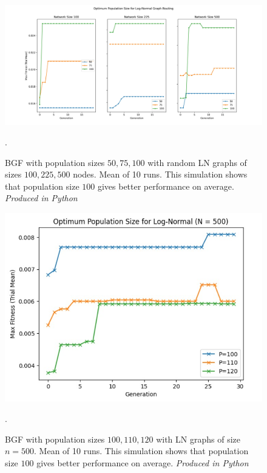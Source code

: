 \documentclass[
	a4paper, %
	10pt, %
	unnumberedsections, %
	twoside, %
]{LTJournalArticle}
\begin{document}
\begin{figure}
	\includegraphics[width=\linewidth]{Figures/sims/population/lognormal.jpg}
	\caption{BGF with population sizes \(50, 75, 100\) with random LN graphs of sizes \(100, 225, 500\) nodes. Mean of 10 runs. This simulation shows that population size \(100\) gives better performance on average. \emph{Produced in Python}}. 
	\label{fig:pop_1}
\end{figure}

\begin{figure}[H]
	\includegraphics[width=\linewidth]{Figures/sims/population/ln_500.jpg}
	\caption{BGF with population sizes \(100, 110, 120\) with LN graphs of size \(n = 500\). Mean of 10 runs. This simulation shows that population size \(100\) gives better performance on average. \emph{Produced in Python}}. 
	\label{fig:ln_500}
\end{figure}
\end{document}
